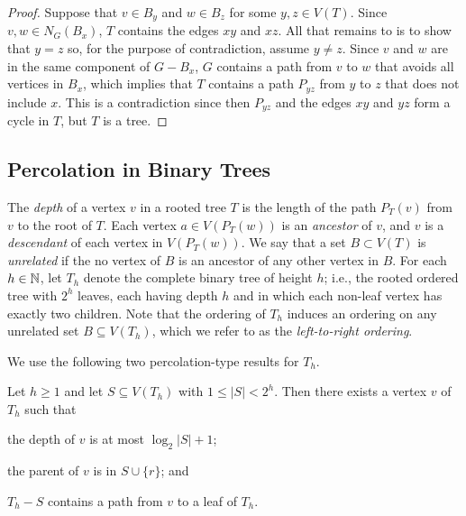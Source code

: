 \documentclass{patmorin}
\newcommand{\defin}[1]{\emph{\color{brightmaroon}#1}}
\renewcommand{\le}{\leqslant}
\renewcommand{\ge}{\geqslant}
\begin{document}
\begin{proof}
  Suppose that $v\in B_y$ and $w\in B_z$ for some $y,z\in V(T)$.  Since $v,w\in N_G(B_x)$, $T$ contains the edges $xy$ and $xz$.  All that remains to is to show that $y=z$ so, for the purpose of contradiction, assume $y\neq z$.  Since $v$ and $w$ are in the same component of $G-B_x$, $G$ contains a path from $v$ to $w$ that avoids all vertices in $B_x$, which implies that $T$ contains a path $P_{yz}$ from $y$ to $z$ that does not include $x$.  This is a contradiction since then $P_{yz}$ and the edges $xy$ and $yz$ form a cycle in $T$, but $T$ is a tree.
\end{proof}

\subsection{Percolation in Binary Trees}


The \defin{depth} of a vertex $v$ in a rooted tree $T$ is the length of the path $P_T(v)$ from $v$ to the root of $T$.  Each vertex $a\in V(P_T(w))$ is an \defin{ancestor} of $v$, and $v$ is a \defin{descendant} of each vertex in $V(P_T(w))$.  We say that a set $B\subset V(T)$ is \defin{unrelated} if the no vertex of $B$ is an ancestor of any other vertex in $B$.  For each $h\in\mathbb{N}$, let $T_h$ denote the complete binary tree of height $h$; i.e., the rooted ordered tree with $2^h$ leaves, each having depth $h$ and in which each non-leaf vertex has exactly two children.  Note that the ordering of $T_h$ induces an ordering on any unrelated set $B\subseteq V(T_h)$, which we refer to as the \defin{left-to-right ordering}.

We use the following two percolation-type results for $T_h$.

\begin{lem}\label{one_path}
  Let $h\ge 1$
  and let $S\subseteq V(T_h)$ with $1\le |S|< 2^h$. Then there exists a vertex $v$ of $T_h$ such that
  \begin{compactenum}[(i)]
    \item the depth of $v$ is at most $\log_2|S|+1$;
    \item the parent of $v$ is in $S\cup\{r\}$; and
    \item $T_h-S$ contains a path from $v$ to a leaf of $T_h$.
  \end{compactenum}
\end{lem}
\end{document}
